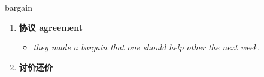 
\begin{frame}
{\huge bargain}
\begin{center}
\begin{enumerate}\Large
  \item \textbf{协议 agreement}
  \begin{itemize}
    \item \em{\Large{they made a bargain that one should help other the next week.}}
  \end{itemize}
  \item \textbf{讨价还价}
\end{enumerate}
\end{center}
\end{frame}
